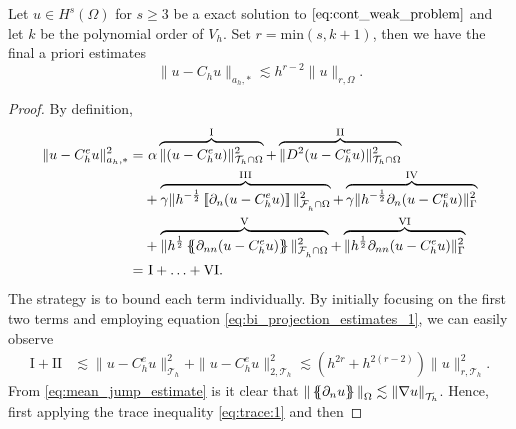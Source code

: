 \begin{lemma}
    \label{lemma:astar_estimate}
    Let $u \in H^{s}( \Omega ) $ for $s\ge 3$ be a exact solution to $\eqref{eq:cont_weak_problem} $ and let $k$ be the polynomial order of $V_{h}$. Set $r = \mathrm{min} ( s, k+1)$, then we have the final a priori estimates
    \begin{equation}
    \|  u - C_{h}u \|_{ a_{h},*  }^{  } \lesssim h^{r-2} \| u \|_{ r, \Omega  }^{  }.
    \end{equation}
\end{lemma}
\begin{proof}
    By definition,
    \begin{equation}
        \begin{split}
            \| u - C_{h}^{e}u \|_{ a_{h}, * }^{  2}  =& \ \alpha  \overbrace{\|  ( u - C_{h}^{e}u) \|_{ \mathcal{T} _{h} \cap \Omega  }^{ 2}}^{\mathrm{I} }   + \overbrace{\| D^2 ( u - C_{h}^{e}u ) \|_{\mathcal{T} _{h} \cap \Omega   }^{ 2
            }}^{\mathrm{II} }  \\  &  +
            \overbrace{\gamma \| h^{-\frac{1}{2}} \jump{ \partial _{n} (u -
        C_{h}^{e} u) }   \|_{ \mathcal{F}_{h}^{}\cap \Omega    }^{ 2
        }}^{\mathrm{III} }  + \overbrace{\gamma \| h^{-\frac{1}{2}}  \partial _{n} (u - C_{h}^{e}u)    \|_{ \Gamma   }^{ 2 }}^{\mathrm{IV} }  \\
          & + \overbrace{\| h^{\frac{1}{2}} \mean{ \partial _{nn} (u - C_{h}^{e}u) }   \|_{\mathcal{F} _{h}^{} \cap \Omega   }^{  2}}^{\mathrm{V} }  +  \overbrace{\| h^{\frac{1}{2}} \partial _{nn}(u - C_{h}^{e}u)     \|_{ \Gamma }^{  2}}^{\mathrm{VI}
          } \\
          =& \  \mathrm{I}  + \ldots + \mathrm{VI}.
        \end{split}
    \end{equation}
    The strategy is to bound each term individually.
    By initially focusing on the first two terms and employing equation \eqref{eq:bi_projection_estimates_1}, we can easily observe
             \begin{equation}
        \begin{split}
            \mathrm{I} +\mathrm{II}  & \lesssim \|   u - C_{h}^{e}u \|_{ \mathcal{T} _{h}  }^{ 2} + \|  u - C_{h}^{e}u  \|_{2,\mathcal{T} _{h} }^{ 2 }  \lesssim  ( h^{2r}  + h^{2(r-2)} )\| u \|_{r,\mathcal{T}_{h} }^{  2}.
        \end{split}
             \end{equation}
    From \eqref{eq:mean_jump_estimate} is it clear that $\| \left\{\!\!\left\{ \partial _{n} u \right\}\!\!\right\}   \|_{ \Omega  }^{  } \lesssim \| \nabla  u \|_{ \mathcal{T} _{h} }^{  }   $. Hence, first applying the trace inequality \eqref{eq:trace:1}  and then

\end{proof}

